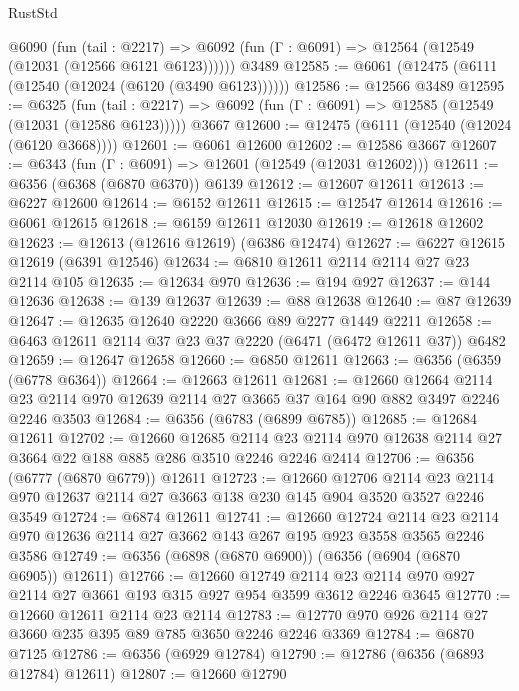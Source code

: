 \begin{lexlean}{RustStd}
\begin{coremodule}
{\begin{coremodule}
{{{{{{{{{{{{{{{{{{{{{{{{{{    @6090
      (fun (tail : @2217) =>
      @6092 (fun (Γ : @6091) => @12564 (@12549 (@12031 (@12566 @6121 @6123))))))
    @3489
@12585 := @6061 (@12475 (@6111 (@12540 (@12024 (@6120 (@3490 @6123))))))
@12586 := @12566 @3489
@12595 := @6325
    (fun (tail : @2217) => @6092 (fun (Γ : @6091) => @12585 (@12549 (@12031 (@12586 @6123)))))
    @3667
@12600 := @12475 (@6111 (@12540 (@12024 (@6120 @3668))))
@12601 := @6061 @12600
@12602 := @12586 @3667
@12607 := @6343 (fun (Γ : @6091) => @12601 (@12549 (@12031 @12602)))
@12611 := @6356 (@6368 (@6870 @6370)) @6139
@12612 := @12607 @12611
@12613 := @6227 @12600
@12614 := @6152 @12611
@12615 := @12547 @12614
@12616 := @6061 @12615
@12618 := @6159 @12611 @12030
@12619 := @12618 @12602
@12623 := @12613 (@12616 @12619) (@6386 @12474)
@12627 := @6227 @12615 @12619 (@6391 @12546)
@12634 := @6810 @12611 @2114 @2114 @27 @23 @2114 @105
@12635 := @12634 @970
@12636 := @194 @927
@12637 := @144 @12636
@12638 := @139 @12637
@12639 := @88 @12638
@12640 := @87 @12639
@12647 := @12635 @12640 @2220 @3666 @89 @2277 @1449 @2211
@12658 := @6463 @12611 @2114 @37 @23 @37 @2220 (@6471 (@6472 @12611 @37)) @6482
@12659 := @12647 @12658
@12660 := @6850 @12611
@12663 := @6356 (@6359 (@6778 @6364))
@12664 := @12663 @12611
@12681 := @12660
    @12664
    @2114
    @23
    @2114
    @970
    @12639
    @2114
    @27
    @3665
    @37
    @164
    @90
    @882
    @3497
    @2246
    @2246
    @3503
@12684 := @6356 (@6783 (@6899 @6785))
@12685 := @12684 @12611
@12702 := @12660
    @12685
    @2114
    @23
    @2114
    @970
    @12638
    @2114
    @27
    @3664
    @22
    @188
    @885
    @286
    @3510
    @2246
    @2246
    @2414
@12706 := @6356 (@6777 (@6870 @6779)) @12611
@12723 := @12660
    @12706
    @2114
    @23
    @2114
    @970
    @12637
    @2114
    @27
    @3663
    @138
    @230
    @145
    @904
    @3520
    @3527
    @2246
    @3549
@12724 := @6874 @12611
@12741 := @12660
    @12724
    @2114
    @23
    @2114
    @970
    @12636
    @2114
    @27
    @3662
    @143
    @267
    @195
    @923
    @3558
    @3565
    @2246
    @3586
@12749 := @6356 (@6898 (@6870 @6900)) (@6356 (@6904 (@6870 @6905)) @12611)
@12766 := @12660
    @12749
    @2114
    @23
    @2114
    @970
    @927
    @2114
    @27
    @3661
    @193
    @315
    @927
    @954
    @3599
    @3612
    @2246
    @3645
@12770 := @12660 @12611 @2114 @23 @2114
@12783 := @12770 @970 @926 @2114 @27 @3660 @235 @395 @89 @785 @3650 @2246 @2246 @3369
@12784 := @6870 @7125
@12786 := @6356 (@6929 @12784)
@12790 := @12786 (@6356 (@6893 @12784) @12611)
@12807 := @12660
    @12790
}}}}}}}}}}}}}}}}}}}}}}}}}}
\end{coremodule}}
\end{coremodule}
\end{lexlean}
